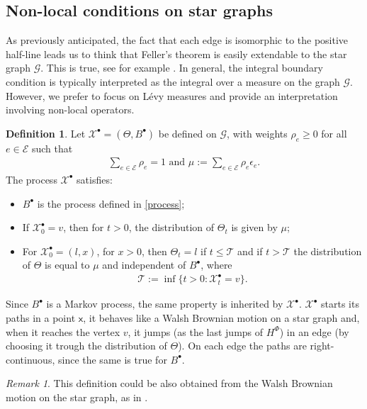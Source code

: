 \documentclass[11pt,a4paper]{article}
\theoremstyle{plain}
\theoremstyle{definition}
\newtheorem{definition}[theorem]{Definition}
\theoremstyle{remark}
\newtheorem{remark}{Remark}
\begin{document}
		\subsection{Non-local conditions on star graphs}
		As previously anticipated, the fact that each edge is isomorphic to the positive half-line leads us to think that Feller's theorem is easily extendable to the star graph $\mathcal{G}$. This is true, see for example \cite[Theorem 20.26]{werner2016brownian}. In general, the integral boundary condition is typically interpreted as the integral over a measure on the graph $\mathcal{G}$. However, we prefer to focus on L\'evy measures and provide an interpretation involving non-local operators.
		\begin{definition}
			\label{def:Xpallino}
			Let $\mathcal{X}^\bullet=(\Theta, B^\bullet)$ be defined on $\mathcal{G}$, with weights $\rho_e \geq 0$ for all $e \in \mathcal{E}$ such that 
			\begin{align*}
				\sum_{e \in \mathcal{E}} \rho_e = 1 \text{ and } \mu := \sum_{e \in \mathcal{E}} \rho_e \epsilon_e.
			\end{align*}
			The process $\mathcal{X}^\bullet$ satisfies:
			\begin{itemize}
				\item $B^\bullet$ is the process defined in \eqref{process};
				\item If $\mathcal{X}^\bullet_0=v$, then for $t>0$, the distribution of $\Theta_t$ is given by $\mu$;
				\item For $\mathcal{X}^\bullet_0=(l,x)$, for $x>0$, then  $\Theta_t=l$ if $t \leq \mathcal{T}$ and if $t>\mathcal{T}$ the distribution of $\Theta$ is equal to $\mu$ and independent of $B^\bullet$,
				where 
				\begin{align*}
					\mathcal{T}:=\inf \{t>0 : \mathcal{X}^\bullet_t=v\}.
				\end{align*}
			\end{itemize}
		\end{definition}
		Since $B^\bullet$ is a  Markov process, the same property is inherited by $\mathcal{X}^\bullet$. $\mathcal{X}^\bullet$ starts its paths in a point $\mathsf{x}$, it behaves like a Walsh Brownian motion on a star graph and, when it reaches the vertex $v$, it jumps (as the last jumps of $H^\Phi$) in an edge (by choosing it trough the distribution of $\Theta$). On each edge the paths are right-continuous, since the same is true for $B^\bullet$.
		\begin{remark}
			This definition could be also obtained from the Walsh Brownian motion on the star graph, as in \cite[Section 21]{werner2016brownian}.
		\end{remark}
\end{document}
